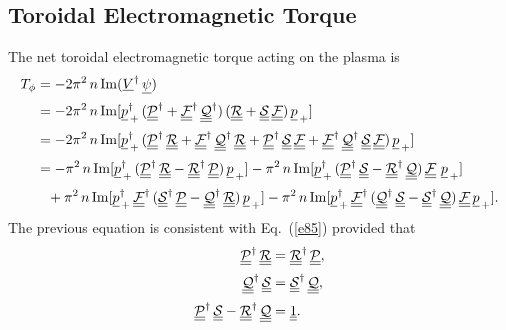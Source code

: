 \documentclass[12pt,prb,aps,notitlepage]{revtex4-1}
\begin{document}
\subsection{Toroidal Electromagnetic Torque}
The net toroidal electromagnetic torque acting on the plasma is
\begin{align}
T_\phi &= -2\pi^2\,n\,{\rm Im}(\underline{V}^\dag\,\underline{\psi})\nonumber\\[0.5ex]
&
= -2\pi^2\,n\,{\rm Im}[\underline{p}_{\,+}^\dag\,( \underline{\underline{\cal P}}^\dag+\underline{\underline{\cal F}}^\dag\,\underline{\underline{\cal Q}}^\dag)\,
( \underline{\underline{\cal R}}+\underline{\underline{\cal S}}\,\underline{\underline{\cal F}})\,\underline{p}_{\,+}]\nonumber\\[0.5ex]
&= -2\pi^2\,n\,{\rm Im}[\underline{p}_{\,+}^\dag\,(\underline{\underline{\cal P}}^\dag\,\underline{\underline{\cal R}}
+ \underline{\underline{\cal F}}^\dag\,\underline{\underline{\cal Q}}^\dag\,\underline{\underline{\cal R}} +\underline{\underline{\cal P}}^\dag\,\underline{\underline{\cal S}}\,
\underline{\underline{\cal F}}+
 \underline{\underline{\cal F}}^\dag\,\underline{\underline{\cal Q}}^\dag\,\underline{\underline{\cal S}}\,\underline{\underline{\cal F}})\,
\underline{p}_{\,+}]\nonumber\\[0.5ex]
&= - \pi^2\,n\,{\rm Im}[\underline{p}_{\,+}^\dag\,(\underline{\underline{\cal P}}^\dag\,\underline{\underline{\cal R}}- \underline{\underline{\cal R}}^\dag\,\underline{\underline{\cal P}})\,
\underline{p}_{\,+}]  
- \pi^2\,n\,{\rm Im}[\underline{p}_{\,+}^\dag\,(\underline{\underline{\cal P}}^\dag\,\underline{\underline{\cal S}}- \underline{\underline{\cal R}}^\dag\,\underline{\underline{\cal Q}})\,\underline{\underline{\cal F}}\,\,\underline{p}_{\,+}]\nonumber\\[0.5ex]
&\phantom{=}
+ \pi^2\,n\,{\rm Im}[\underline{p}_{\,+}^\dag\,\underline{\underline{\cal F}}^\dag\,(\underline{\underline{\cal S}}^\dag\,\underline{\underline{\cal P}}- \underline{\underline{\cal Q}}^\dag\,\underline{\underline{\cal R}})\,\underline{p}_{\,+}]
- \pi^2\,n\,{\rm Im}[\underline{p}_{\,+}^\dag\,\underline{\underline{\cal F}}^\dag\,(\underline{\underline{\cal Q}}^\dag\,\underline{\underline{\cal S}}- \underline{\underline{\cal S}}^\dag\,\underline{\underline{\cal Q}})\,\underline{\underline{\cal F}}\,\underline{p}_{\,+}].
\end{align}
The previous equation is consistent with Eq.~(\ref{e85}) provided that
\begin{align}
\underline{\underline{\cal P}}^\dag\,\underline{\underline{\cal R}}&= \underline{\underline{\cal R}}^\dag\,\underline{\underline{\cal P}},\label{e100}\\[0.5ex]
\underline{\underline{\cal Q}}^\dag\,\underline{\underline{\cal S}}&= \underline{\underline{\cal S}}^\dag\,\underline{\underline{\cal Q}},\\[0.5ex]
\underline{\underline{\cal P}}^\dag\,\underline{\underline{\cal S}}- \underline{\underline{\cal R}}^\dag\,\underline{\underline{\cal Q}}&=\underline{\underline{1}}.\label{e103}
\end{align}
\end{document}
